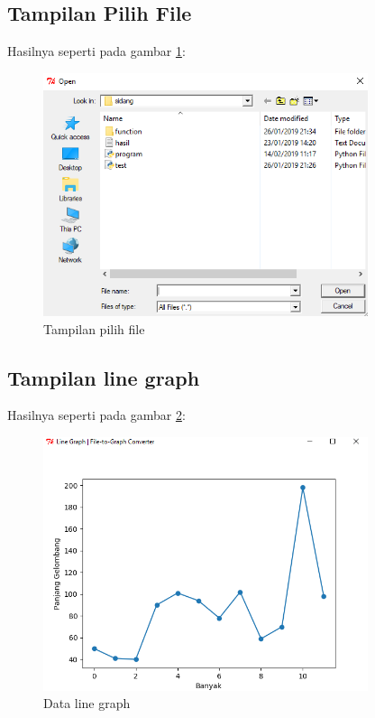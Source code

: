 \subsection{Tampilan Pilih File}
Hasilnya seperti pada gambar \ref{fig:tampilanpilih}:
\begin{figure}[!htbp]
	\centerline{\includegraphics[width=0.85\textwidth]{figures/3/tampilanpilih.PNG}}
	\caption{Tampilan pilih file}
	\label{fig:tampilanpilih}
\end{figure}

\subsection{Tampilan line graph}
Hasilnya seperti pada gambar \ref{fig:linegraph}:
\begin{figure}[!htbp]
	\centerline{\includegraphics[width=0.85\textwidth]{figures/3/linegraph.PNG}}
	\caption{Data line graph}
	\label{fig:linegraph}
\end{figure}

